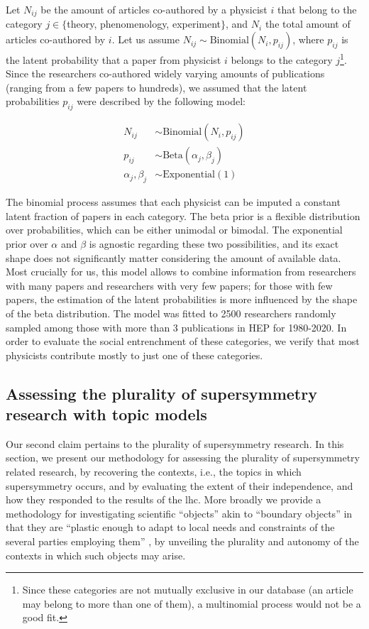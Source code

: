 \documentclass[smallextended]{svjour3}
\begin{document}
Let $N_{ij}$ be the amount of articles co-authored by a physicist $i$ that belong to the category $j \in \{$theory, phenomenology, experiment$\}$, and $N_i$ the total amount of articles co-authored by $i$. Let us assume $N_{ij} \sim \mathrm{Binomial}(N_i, p_{ij})$, where $p_{ij}$ is the latent probability that a paper from physicist $i$ belongs to the category $j$\footnote{Since these categories are not mutually exclusive in our database (an article may belong to more than one of them), a multinomial process would not be a good fit.}. Since the researchers co-authored widely varying amounts of publications (ranging from a few papers to hundreds), we assumed that the latent probabilities $p_{ij}$ were described by the following model:

\begin{align*}
    N_{ij} &\sim \mathrm{Binomial}(N_i, p_{ij})\\
    p_{ij} &\sim \mathrm{Beta}(\alpha_j, \beta_j) \\
    \alpha_j,\beta_j &\sim \mathrm{Exponential}(1)
\end{align*}

The binomial process assumes that each physicist can be imputed a constant latent fraction of papers in each category. The beta prior is a flexible distribution over probabilities, which can be either unimodal or bimodal. The exponential prior over $\alpha$ and $\beta$ is agnostic regarding these two possibilities, and its exact shape does not significantly matter considering the amount of available data. Most crucially for us, this model allows to combine information from researchers with many papers and researchers with very few papers; for those with few papers, the estimation of the latent probabilities is more influenced by the shape of the beta distribution. The model was fitted to 2500 researchers randomly sampled among those with more than 3 publications in HEP for 1980-2020. In order to evaluate the social entrenchment of these categories, we verify that most physicists contribute mostly to just one of these categories.

\subsection{Assessing the plurality of supersymmetry research with topic models}\label{section:method_plurality}

Our second claim pertains to the plurality of supersymmetry research. In this section, we present our methodology for assessing the plurality of supersymmetry related research, by recovering the contexts, i.e., the topics in which supersymmetry occurs, and by evaluating the extent of their independence, and how they responded to the results of the \gls{lhc}. More broadly we provide a methodology for investigating scientific ``objects'' akin to ``boundary objects'' in that they are ``plastic enough to adapt to local needs and constraints of the several parties employing them'' \citep[p.~393]{Star1989}, by unveiling the plurality and autonomy of the contexts in which such objects may arise.
\end{document}

